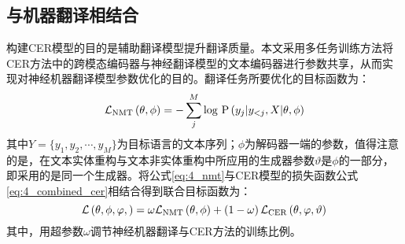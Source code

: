\subsection{与机器翻译相结合}
构建CER模型的目的是辅助翻译模型提升翻译质量。本文采用多任务训练方法将CER方法中的跨模态编码器与神经翻译模型的文本编码器进行参数共享，从而实现对神经机器翻译模型参数优化的目的。翻译任务所要优化的目标函数为：
\begin{equation}
\mathcal{L}_{\rm{NMT}} \left( \theta, \phi \right) =
    -\mathop{\sum}_j^M {\rm log}{\ }{\rm P} \left(y_j \vert y_{<j}, X \vert \theta, \phi \right)
\label{eq:4_nmt}
\end{equation}
其中$Y=\{y_1,y_2,\cdots,y_M\}$为目标语言的文本序列；$\phi$为解码器一端的参数，值得注意的是，在文本实体重构与文本非实体重构中所应用的生成器参数$\vartheta$是$\phi$的一部分，即采用的是同一个生成器。将公式\ref{eq:4_nmt}与CER模型的损失函数公式\ref{eq:4_combined_cer}相结合得到联合目标函数为：
\begin{equation}
\mathcal{L} \left( \theta, \phi, \varphi, \right) = \omega\mathcal{L}_{\rm{NMT}} \left( \theta, \phi \right) + \left( 1-\omega \right) \mathcal{L}_{\rm{CER}} \left( \theta, \varphi, \vartheta \right)
\end{equation}
其中，用超参数$\omega$调节神经机器翻译与CER方法的训练比例。